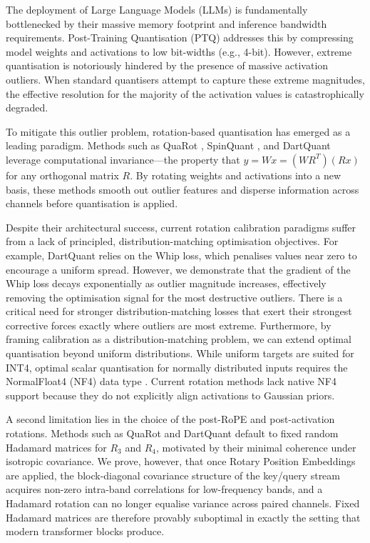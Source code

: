 \documentclass[11pt,a4paper]{article}
\begin{document}
The deployment of Large Language Models (LLMs) is fundamentally bottlenecked by their massive memory footprint and inference bandwidth requirements. Post-Training Quantisation (PTQ) addresses this by compressing model weights and activations to low bit-widths (e.g., 4-bit). However, extreme quantisation is notoriously hindered by the presence of massive activation outliers. When standard quantisers attempt to capture these extreme magnitudes, the effective resolution for the majority of the activation values is catastrophically degraded.

To mitigate this outlier problem, rotation-based quantisation has emerged as a leading paradigm. Methods such as QuaRot \cite{quarot}, SpinQuant \cite{spinquant}, and DartQuant \cite{dartquant} leverage computational invariance---the property that $y = Wx = \left(WR^T\right)\left(Rx\right)$ for any orthogonal matrix $R$. By rotating weights and activations into a new basis, these methods smooth out outlier features and disperse information across channels before quantisation is applied.

Despite their architectural success, current rotation calibration paradigms suffer from a lack of principled, distribution-matching optimisation objectives. For example, DartQuant relies on the Whip loss, which penalises values near zero to encourage a uniform spread. However, we demonstrate that the gradient of the Whip loss decays exponentially as outlier magnitude increases, effectively removing the optimisation signal for the most destructive outliers. There is a critical need for stronger distribution-matching losses that exert their strongest corrective forces exactly where outliers are most extreme. Furthermore, by framing calibration as a distribution-matching problem, we can extend optimal quantisation beyond uniform distributions. While uniform targets are suited for INT4, optimal scalar quantisation for normally distributed inputs requires the NormalFloat4 (NF4) data type \cite{qlora}. Current rotation methods lack native NF4 support because they do not explicitly align activations to Gaussian priors.

A second limitation lies in the choice of the post-RoPE and post-activation rotations. Methods such as QuaRot and DartQuant default to fixed random Hadamard matrices for $R_3$ and $R_4$, motivated by their minimal coherence under isotropic covariance. We prove, however, that once Rotary Position Embeddings are applied, the block-diagonal covariance structure of the key/query stream acquires non-zero intra-band correlations for low-frequency bands, and a Hadamard rotation can no longer equalise variance across paired channels. Fixed Hadamard matrices are therefore provably suboptimal in exactly the setting that modern transformer blocks produce.
\end{document}

